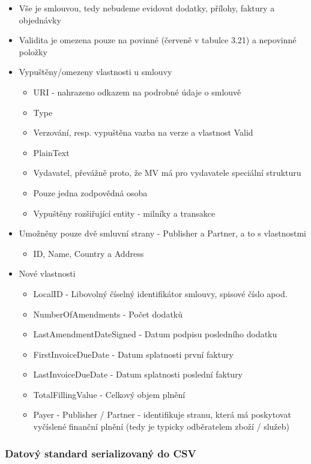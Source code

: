 \begin{itemize}
\item Vše je smlouvou, tedy nebudeme evidovat dodatky, přílohy, faktury a objednávky
\item Validita je omezena pouze na povinné (červeně v tabulce 3.21) a nepovinné položky
\item Vypuštěny/omezeny vlastnosti u smlouvy
	\begin{itemize}
	\item URI - nahrazeno odkazem na podrobné údaje o smlouvě
	\item Type
	\item Verzování, resp. vypuštěna vazba na verze a vlastnost Valid
	\item PlainText
	\item Vydavatel, převážně proto, že MV má pro vydavatele speciální strukturu
	\item Pouze jedna zodpovědná osoba
	\item Vypuštěny rozšiřující entity - milníky a transakce
	\end{itemize}
\item Umožněny pouze dvě  smluvní strany - Publisher a Partner, a to s vlastnostmi
	\begin{itemize}
	\item ID, Name, Country a Address
	\end{itemize}
\item Nové vlastnosti
	\begin{itemize}
	\item LocalID - Libovolný číselný identifikátor smlouvy, spisové číslo apod.
	\item NumberOfAmendments - Počet dodatků
	\item LastAmendmentDateSigned - Datum podpisu posledního dodatku 
	\item FirstInvoiceDueDate - Datum splatnosti první faktury 
	\item LastInvoiceDueDate - Datum splatnosti poslední faktury 
	\item TotalFillingValue - Celkový objem plnění
	\item Payer - Publisher / Partner - identifikuje stranu, která má poskytovat vyčíslené finanční plnění (tedy je typicky odběratelem zboží / služeb)
	\end{itemize}
\end{itemize}

\newpage

\subsubsection*{Datový standard serializovaný do CSV}

